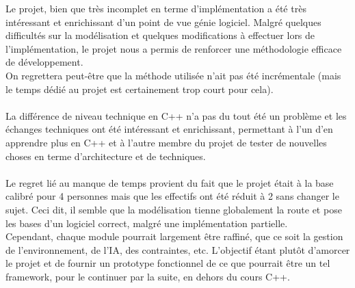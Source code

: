 Le projet, bien que très incomplet en terme d'implémentation a été très intéressant et enrichissant d'un point de vue génie logiciel. Malgré quelques difficultés sur la modélisation et quelques modifications à effectuer lors de l'implémentation, le projet nous a permis de renforcer une méthodologie efficace de développement.\\
On regrettera peut-être que la méthode utilisée n'ait pas été incrémentale (mais le temps dédié au projet est certainement trop court pour cela).\\\\

La différence de niveau technique en C++ n'a pas du tout été un problème et les échanges techniques ont été intéressant et enrichissant, permettant à l'un d'en apprendre plus en C++ et à l'autre membre du projet de tester de nouvelles choses en terme d'architecture et de techniques.\\\\

Le regret lié au manque de temps provient du fait que le projet était à la base calibré pour 4 personnes mais que les effectifs ont été réduit à 2 sans changer le sujet. Ceci dit, il semble que la modélisation tienne globalement la route et pose les bases d'un logiciel correct, malgré une implémentation partielle.\\
Cependant, chaque module pourrait largement être raffiné, que ce soit la gestion de l'environnement, de l'IA, des contraintes, etc. L'objectif étant plutôt d'amorcer le projet et de fournir un prototype fonctionnel de ce que pourrait être un tel framework, pour le continuer par la suite, en dehors du cours C++.

